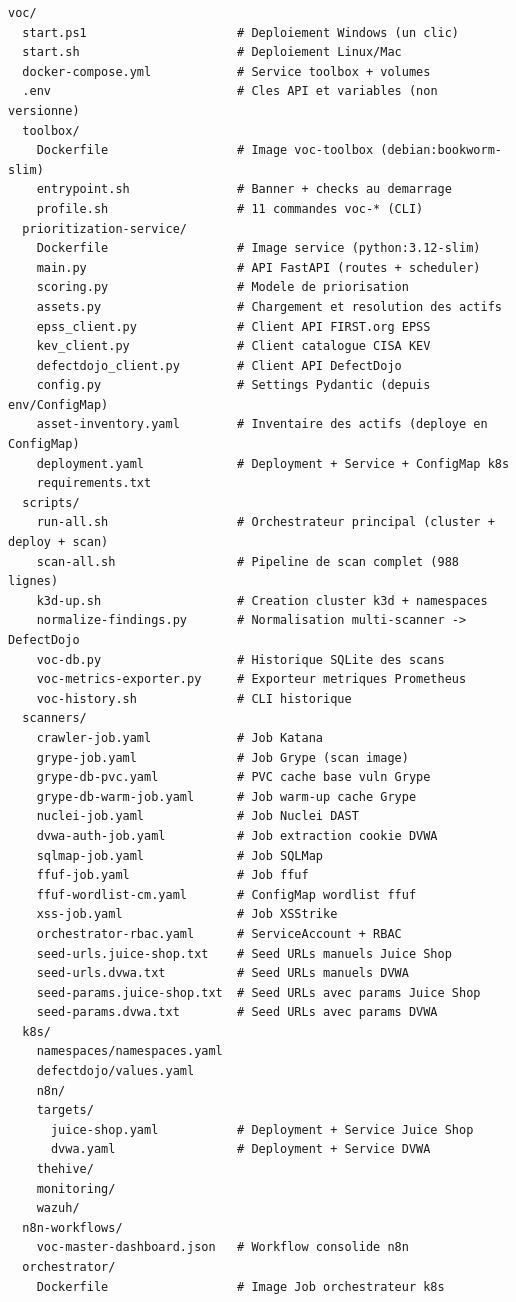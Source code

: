 \documentclass[12pt,a4paper]{report}
\begin{document}
\begin{lstlisting}[caption={Arborescence du dépôt VOC}, label={lst:project_tree}]
voc/
  start.ps1                     # Deploiement Windows (un clic)
  start.sh                      # Deploiement Linux/Mac
  docker-compose.yml            # Service toolbox + volumes
  .env                          # Cles API et variables (non versionne)
  toolbox/
    Dockerfile                  # Image voc-toolbox (debian:bookworm-slim)
    entrypoint.sh               # Banner + checks au demarrage
    profile.sh                  # 11 commandes voc-* (CLI)
  prioritization-service/
    Dockerfile                  # Image service (python:3.12-slim)
    main.py                     # API FastAPI (routes + scheduler)
    scoring.py                  # Modele de priorisation
    assets.py                   # Chargement et resolution des actifs
    epss_client.py              # Client API FIRST.org EPSS
    kev_client.py               # Client catalogue CISA KEV
    defectdojo_client.py        # Client API DefectDojo
    config.py                   # Settings Pydantic (depuis env/ConfigMap)
    asset-inventory.yaml        # Inventaire des actifs (deploye en ConfigMap)
    deployment.yaml             # Deployment + Service + ConfigMap k8s
    requirements.txt
  scripts/
    run-all.sh                  # Orchestrateur principal (cluster + deploy + scan)
    scan-all.sh                 # Pipeline de scan complet (988 lignes)
    k3d-up.sh                   # Creation cluster k3d + namespaces
    normalize-findings.py       # Normalisation multi-scanner -> DefectDojo
    voc-db.py                   # Historique SQLite des scans
    voc-metrics-exporter.py     # Exporteur metriques Prometheus
    voc-history.sh              # CLI historique
  scanners/
    crawler-job.yaml            # Job Katana
    grype-job.yaml              # Job Grype (scan image)
    grype-db-pvc.yaml           # PVC cache base vuln Grype
    grype-db-warm-job.yaml      # Job warm-up cache Grype
    nuclei-job.yaml             # Job Nuclei DAST
    dvwa-auth-job.yaml          # Job extraction cookie DVWA
    sqlmap-job.yaml             # Job SQLMap
    ffuf-job.yaml               # Job ffuf
    ffuf-wordlist-cm.yaml       # ConfigMap wordlist ffuf
    xss-job.yaml                # Job XSStrike
    orchestrator-rbac.yaml      # ServiceAccount + RBAC
    seed-urls.juice-shop.txt    # Seed URLs manuels Juice Shop
    seed-urls.dvwa.txt          # Seed URLs manuels DVWA
    seed-params.juice-shop.txt  # Seed URLs avec params Juice Shop
    seed-params.dvwa.txt        # Seed URLs avec params DVWA
  k8s/
    namespaces/namespaces.yaml
    defectdojo/values.yaml
    n8n/
    targets/
      juice-shop.yaml           # Deployment + Service Juice Shop
      dvwa.yaml                 # Deployment + Service DVWA
    thehive/
    monitoring/
    wazuh/
  n8n-workflows/
    voc-master-dashboard.json   # Workflow consolide n8n
  orchestrator/
    Dockerfile                  # Image Job orchestrateur k8s
\end{lstlisting}
\end{document}
